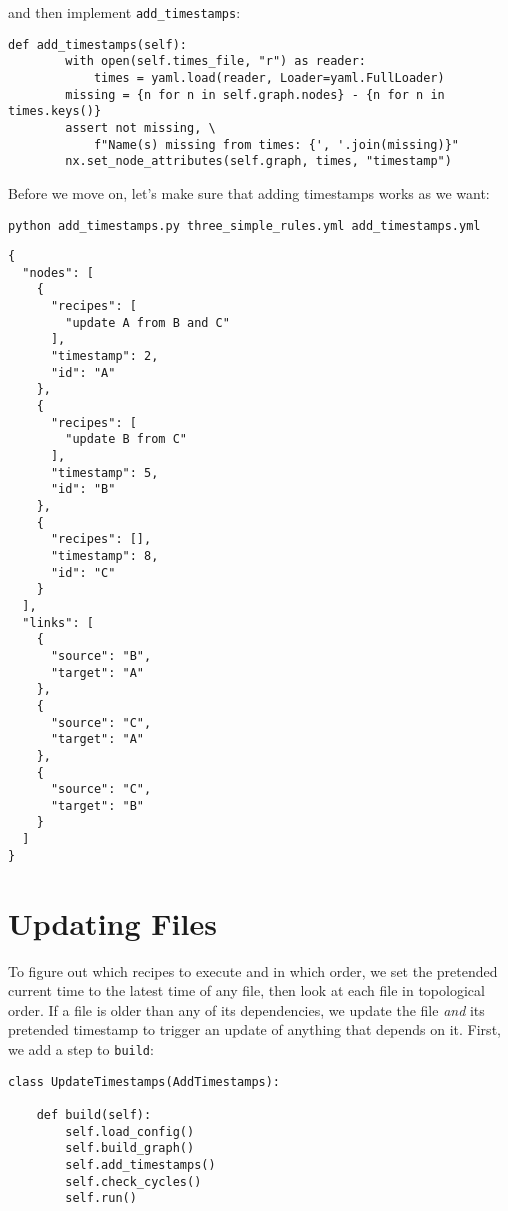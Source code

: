 \documentclass{scrbook}
\begin{document}
\noindent and then implement \texttt{add\_timestamps}:


\begin{lstlisting}[frame=single,frameround=tttt]
    def add_timestamps(self):
        with open(self.times_file, "r") as reader:
            times = yaml.load(reader, Loader=yaml.FullLoader)
        missing = {n for n in self.graph.nodes} - {n for n in times.keys()}
        assert not missing, \
            f"Name(s) missing from times: {', '.join(missing)}"
        nx.set_node_attributes(self.graph, times, "timestamp")
\end{lstlisting}



Before we move on,
let's make sure that adding timestamps works as we want:


\begin{lstlisting}[frame=single,frameround=tttt]
python add_timestamps.py three_simple_rules.yml add_timestamps.yml
\end{lstlisting}



\begin{lstlisting}[frame=single,frameround=tttt]
{
  "nodes": [
    {
      "recipes": [
        "update A from B and C"
      ],
      "timestamp": 2,
      "id": "A"
    },
    {
      "recipes": [
        "update B from C"
      ],
      "timestamp": 5,
      "id": "B"
    },
    {
      "recipes": [],
      "timestamp": 8,
      "id": "C"
    }
  ],
  "links": [
    {
      "source": "B",
      "target": "A"
    },
    {
      "source": "C",
      "target": "A"
    },
    {
      "source": "C",
      "target": "B"
    }
  ]
}
\end{lstlisting}


\section{Updating Files}\label{builder-update}


To figure out which recipes to execute and in which order,
we set the pretended current time to the latest time of any file,
then look at each file in topological order.
If a file is older than any of its dependencies,
we update the file \emph{and} its pretended timestamp
to trigger an update of anything that depends on it.
First,
we add a step to \texttt{build}:


\begin{lstlisting}[frame=single,frameround=tttt]
class UpdateTimestamps(AddTimestamps):

    def build(self):
        self.load_config()
        self.build_graph()
        self.add_timestamps()
        self.check_cycles()
        self.run()
\end{lstlisting}
\end{document}
